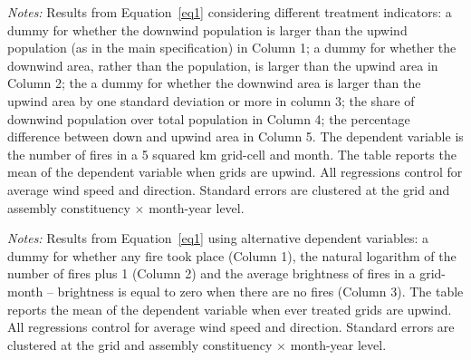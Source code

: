 \documentclass[12pt]{article}
\providecommand{\resultsuffix}{}
\let\SourceInput
\renewcommand{}[1]{%
  \IfFileExists{../../#1\resultsuffix.tex}{\SourceInput{../../#1\resultsuffix.tex}}{%
  \IfFileExists{../../#1}{\SourceInput{../../#1}}{%
    \IfFileExists{../../#1.tex}{\SourceInput{../../#1.tex}}{%
      \fbox{\scriptsize Missing table: \detokenize{#1}}}}}}
\begin{document}
 \begin{table}[htbp!]
     \centering
     \caption{Effect of constituency exposure to smoke on number of fires, robustness by treatment indicator \label{tab:main_by_treat}}
     \resizebox{0.8\textwidth}{!}{
      
      }
     \begin{minipage}{\textwidth}
         {\small \textit{Notes: }Results from Equation~\ref{eq1} considering different treatment indicators: a dummy for whether the downwind population is larger than the upwind population (as in the main specification) in Column 1; a dummy for whether the downwind area, rather than the population, is larger than the upwind area in Column 2; the a dummy for whether the downwind area is larger than the upwind area by one standard deviation or more in column 3; the share of downwind population over total population in Column 4; the percentage difference between down and upwind area in Column 5. The dependent variable is the number of fires in a 5 squared km grid-cell and month. 
         The table reports the mean of the dependent variable when grids are upwind. All regressions control for average wind speed and direction. Standard errors are clustered at the grid and assembly constituency $\times$ month-year level. }
     \end{minipage}
 \end{table}


 \begin{table}[htbp!]
     \centering
     \caption{Effect of constituency exposure to smoke on number of fires, robustness by dependent variable \label{tab:main_bydv}}
     \resizebox{0.8\textwidth}{!}{
      
      }
      \begin{minipage}{\textwidth}
         {\small \textit{Notes: }Results from Equation~\ref{eq1} using alternative dependent variables: a dummy for whether any fire took place (Column 1), the natural logarithm of the number of fires plus 1 (Column 2) and the average brightness of fires in a grid-month -- brightness is equal to zero when there are no fires (Column 3).  
         The table reports the mean of the dependent variable when ever treated grids are upwind. All regressions control for average wind speed and direction. Standard errors are clustered at the grid and assembly constituency $\times$ month-year level. }
     \end{minipage}
 \end{table}
\end{document}
